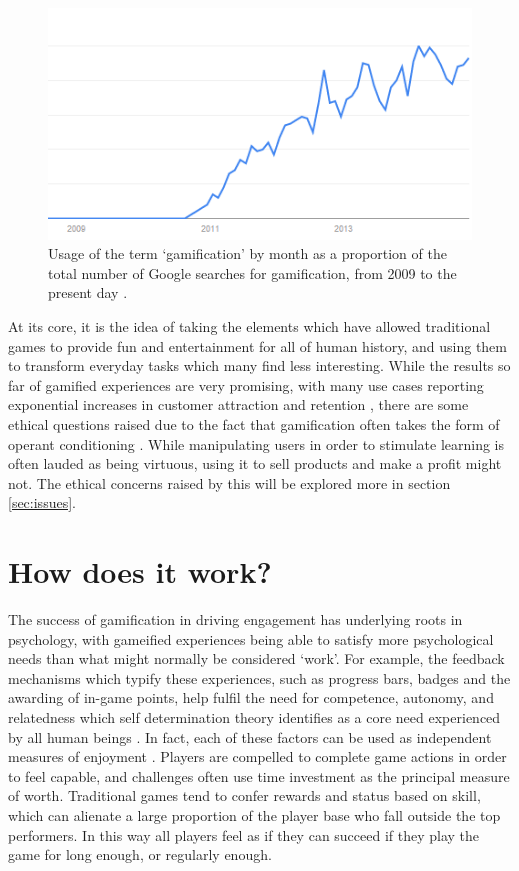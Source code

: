\documentclass[12pt,a4paper,twoside]{report}
\begin{document}
\begin{figure}
\begin{center}
	\includegraphics{../img/usage-graph.png}
	\caption{Usage of the term `gamification' by month as a proportion of the total number of Google searches for gamification, from 2009 to the present day \cite{usage}.}
	\label{usagegraph}
\end{center}
\end{figure}

At its core, it is the idea of taking the elements which have allowed traditional games to provide fun and entertainment for all of human history, and using them to transform everyday tasks which many find less interesting. While the results so far of gamified experiences are very promising, with many use cases reporting exponential increases in customer attraction and retention \cite{zichermann2010game}, there are some ethical questions raised due to the fact that gamification often takes the form of operant conditioning \cite{kapp2012gamification}. While manipulating users in order to stimulate learning is often lauded as being virtuous, using it to sell products and make a profit might not. The ethical concerns raised by this will be explored more in section \ref{sec:issues}.

\section{How does it work?}
The success of gamification in driving engagement has underlying roots in psychology, with gameified experiences being able to satisfy more psychological needs than what might normally be considered `work'. For example, the feedback mechanisms which typify these experiences, such as progress bars, badges and the awarding of in-game points, help fulfil the need for competence, autonomy, and relatedness which self determination theory identifies as a core need experienced by all human beings \cite{przybylski2010motivational}. In fact, each of these factors can be used as independent measures of enjoyment \cite{kapp2012gamification}. Players are compelled to complete game actions in order to feel capable, and challenges often use time investment as the principal measure of worth. Traditional games tend to confer rewards and status based on skill, which can alienate a large proportion of the player base who fall outside the top performers. In this way all players feel as if they can succeed if they play the game for long enough, or regularly enough.
\end{document}
